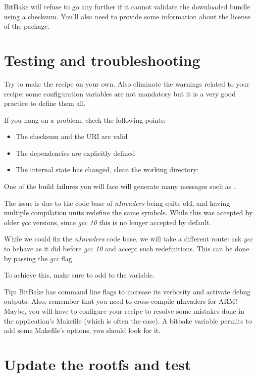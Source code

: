 BitBake will refuse to go any further if it cannot validate the downloaded
bundle using a checksum. You'll also need to provide some information about the
license of the package.

\section{Testing and troubleshooting}

Try to make the recipe on your own. Also eliminate the warnings related to your
recipe: some configuration variables are not mandatory but it is a very good
practice to define them all.

If you hang on a problem, check the following points:
\begin{itemize}
  \item The checksum and the URI are valid
  \item The dependencies are explicitly defined
  \item The internal state has changed, clean the working directory: \\
\end{itemize}

One of the build failures you will face will generate many messages such as
.

The  issue is due to the code base of {\em
nInvaders} being quite old, and having multiple compilation units
redefine the same symbols. While this was accepted by older {\em gcc}
versions, since {\em gcc 10} this is no longer accepted by default.

While we could fix the {\em nInvaders} code base, we will take a
different route: ask {\em gcc} to behave as it did before {\em gcc 10}
and accept such redefinitions. This can be done by passing the
 {\em gcc} flag.

To achieve this, make sure to add  to the 
variable.

Tip: BitBake has command line flags to increase its verbosity and activate debug
outputs. Also, remember that you need to cross-compile nInvaders for ARM! Maybe,
you will have to configure your recipe to resolve some mistakes done in the
application's Makefile (which is often the case). A bitbake variable permits
to add some Makefile's options, you should look for it.

\section{Update the rootfs and test}

